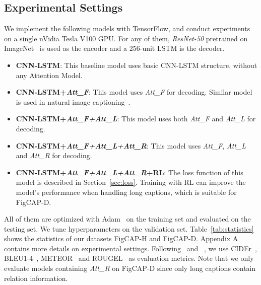 \documentclass[11pt,a4paper]{article}
\begin{document}
\subsection{Experimental Settings}

We implement the following models with TensorFlow, and conduct experiments on a single nVidia Tesla V100 GPU. For any of them, \textit{ResNet-50} pretrained on ImageNet~\cite{deng2009imagenet} is used as the encoder and a 256-unit LSTM is the decoder.
\begin{itemize}
\item \textbf{CNN-LSTM}: This baseline model uses basic CNN-LSTM structure, without any Attention Model. 
\item \textbf{CNN-LSTM+\textit{Att\_F}}: This model uses \textit{Att\_F} for decoding. Similar model is used in natural image captioning~\cite{xu2015show}.
\item \textbf{CNN-LSTM+\textit{Att\_F+Att\_L}}: This model uses both \textit{Att\_F} and \textit{Att\_L} for decoding.
\item \textbf{CNN-LSTM+\textit{Att\_F+Att\_L+Att\_R}}: This model uses \textit{Att\_F}, \textit{Att\_L} and \textit{Att\_R} for decoding. 
\item \textbf{CNN-LSTM+\textit{Att\_F+Att\_L+Att\_R}+RL}: 
The loss function of this model is described in Section~\ref{sec:loss}. Training with RL can improve the model's performance when handling long captions, which is suitable for FigCAP-D.
\end{itemize}
\smallskip\noindent
All of them are optimized with Adam~\cite{kingma2014adam} on the training set and evaluated on the testing set. We tune hyperparameters on the validation set. Table~\ref{tab:statistics} shows the statistics of our datasets FigCAP-H and FigCAP-D. Appendix A contains more details on experimental settings. Following~\cite{xu2015show} and ~\cite{rennie2016self}, we use CIDEr~\cite{vedantam2015cider}, BLEU1-4~\cite{papineni2002bleu}, METEOR~\cite{banerjee2005meteor} and ROUGEL~\cite{lin2004rouge} as evaluation metrics. Note that we only evaluate models containing \textit{Att\_R} on FigCAP-D since only long captions contain relation information.
\end{document}
